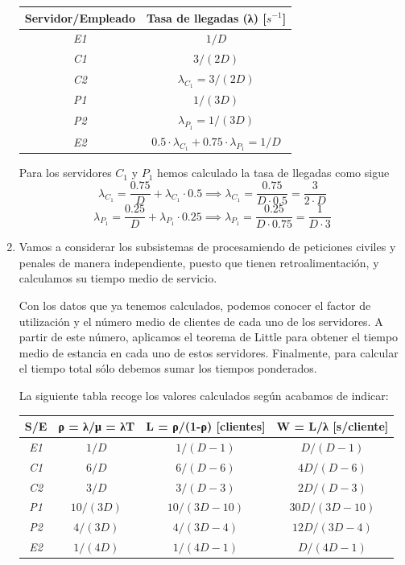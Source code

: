 \begin{problem}[21]
\begin{enumerate}
\begin{center}
\begin{tabular}{| c |  c |}
\hline
  \textbf{Servidor/Empleado}  & \textbf{Tasa de llegadas (λ) [$s^{-1}$]}\\
\hline
 \textit{E1}& $1/D$\\
 \textit{C1}& $3/(2D)$\\
 \textit{C2}& $λ_{C_1} = 3/(2D)$\\
 \textit{P1}& $1/(3D)$\\
 \textit{P2}& $λ_{P_1} = 1/(3D)$\\
 \textit{E2}& $0.5 \cdot λ_{C_1}+0.75 \cdot λ_{P_1} = 1/D$\\
\hline
\end{tabular}
\end{center}

Para los servidores $C_1$ y $P_1$ hemos calculado la tasa de llegadas como sigue
\[λ_{C_1}=\frac{0.75}{D}+λ_{C_1}\cdot 0.5 \implies λ_{C_1} = \frac{0.75}{D \cdot 0.5} = \frac{3}{2\cdot D}\]
\[λ_{P_1}=\frac{0.25}{D}+λ_{P_1}\cdot 0.25 \implies λ_{P_1} = \frac{0.25}{D \cdot 0.75} = \frac{1}{D \cdot 3}\]

\item

Vamos a considerar los subsistemas de procesamiendo de peticiones civiles y penales de manera independiente, puesto que tienen retroalimentación, y calculamos su tiempo medio de servicio.

Con los datos que ya tenemos calculados, podemos conocer el factor de utilización y el número medio de clientes de cada uno de los servidores. A partir de este número, aplicamos el teorema de Little para obtener el tiempo medio de estancia en cada uno de estos servidores. Finalmente, para calcular el tiempo total sólo debemos sumar los tiempos ponderados.

La siguiente tabla recoge los valores calculados según acabamos de indicar:

\begin{adjustwidth}{-2cm}{-2cm}
\begin{center}
\begin{tabular}{| c | c | c | c |}
\hline
  \textbf{S/E}  & \textbf{ρ = λ/μ = λT} & \textbf{L  = ρ/(1-ρ) [clientes]} & \textbf{W  = L/λ  [s/cliente]}\\
\hline
 \textit{E1}& $1/D$ & $1/(D-1)$ & $D/(D-1)$ \\
 \textit{C1}& $6/D$ & $6/(D-6)$ & $4D/(D-6)$ \\
 \textit{C2}& $3/D$ & $3/(D-3)$ & $2D/(D-3)$ \\
 \textit{P1}& $10/(3D)$ & $10/(3D-10)$ & $30D/(3D-10)$ \\
 \textit{P2}& $4/(3D)$ & $4/(3D-4)$ & $12D/(3D-4)$ \\
 \textit{E2}& $1/(4D)$ & $1/(4D-1)$ & $D/(4D-1)$ \\
\hline
\end{tabular}
\end{center}
\end{adjustwidth}


\end{enumerate}
\end{problem}
